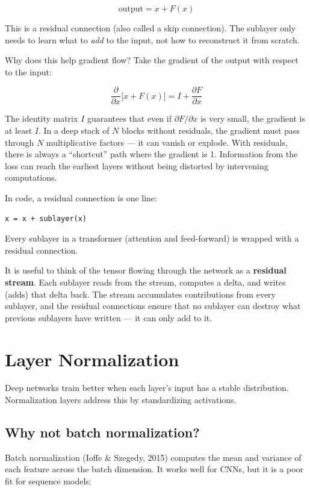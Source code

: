 \[
\text{output} = x + F(x)
\]

This is a residual connection (also called a skip connection). The sublayer only needs to learn what to \textit{add} to the input, not how to reconstruct it from scratch.

Why does this help gradient flow? Take the gradient of the output with respect to the input:

\[
\frac{\partial}{\partial x}\bigl[x + F(x)\bigr] = I + \frac{\partial F}{\partial x}
\]

The identity matrix $I$ guarantees that even if $\partial F / \partial x$ is very small, the gradient is at least $I$. In a deep stack of $N$ blocks without residuals, the gradient must pass through $N$ multiplicative factors --- it can vanish or explode. With residuals, there is always a ``shortcut'' path where the gradient is 1. Information from the loss can reach the earliest layers without being distorted by intervening computations.

In code, a residual connection is one line:

\concepttag
\begin{lstlisting}
x = x + sublayer(x)
\end{lstlisting}

Every sublayer in a transformer (attention and feed-forward) is wrapped with a residual connection.

It is useful to think of the tensor flowing through the network as a \textbf{residual stream}. Each sublayer reads from the stream, computes a delta, and writes (adds) that delta back. The stream accumulates contributions from every sublayer, and the residual connections ensure that no sublayer can destroy what previous sublayers have written --- it can only add to it.

\section{Layer Normalization}

Deep networks train better when each layer's input has a stable distribution. Normalization layers address this by standardizing activations.

\subsection{Why not batch normalization?}

Batch normalization (Ioffe \& Szegedy, 2015) computes the mean and variance of each feature across the batch dimension. It works well for CNNs, but it is a poor fit for sequence models:

